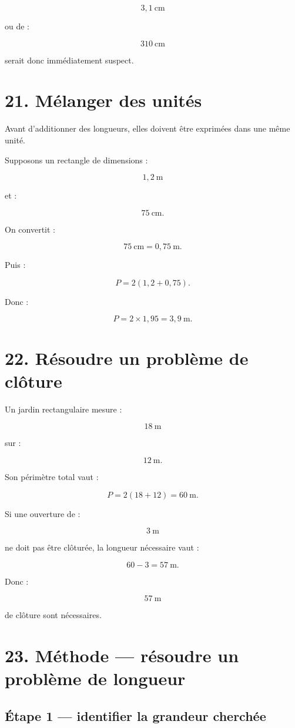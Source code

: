 \[
3{,}1\ \text{cm}
\]

ou de :

\[
310\ \text{cm}
\]

serait donc immédiatement suspect.

\section{21. Mélanger des unités}

Avant d’additionner des longueurs, elles doivent être exprimées dans une même unité.

Supposons un rectangle de dimensions :

\[
1{,}2\ \text{m}
\]

et :

\[
75\ \text{cm}.
\]

On convertit :

\[
75\ \text{cm}=0{,}75\ \text{m}.
\]

Puis :

\[
P=2(1{,}2+0{,}75).
\]

Donc :

\[
P=2\times1{,}95=3{,}9\ \text{m}.
\]

\section{22. Résoudre un problème de clôture}

Un jardin rectangulaire mesure :

\[
18\ \text{m}
\]

sur :

\[
12\ \text{m}.
\]

Son périmètre total vaut :

\[
P=2(18+12)=60\ \text{m}.
\]

Si une ouverture de :

\[
3\ \text{m}
\]

ne doit pas être clôturée, la longueur nécessaire vaut :

\[
60-3=57\ \text{m}.
\]

Donc :

\[
\boxed{57\ \text{m}}
\]

de clôture sont nécessaires.

\section{23. Méthode — résoudre un problème de longueur}

\subsection{Étape 1 — identifier la grandeur cherchée}

